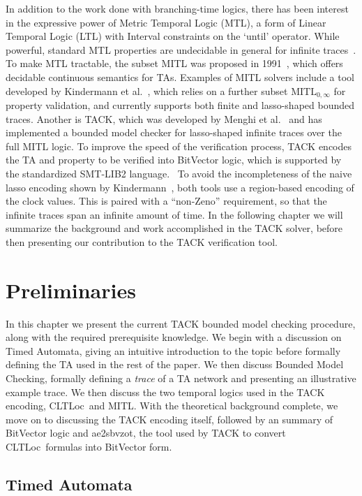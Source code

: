 \documentclass[a4paper,11pt]{report}
\theoremstyle{definition}
\newcommand{\cltloc}{CLTLoc}
\newcommand{\aez}{ae2sbvzot}
\begin{document}
In addition to the work done with branching-time logics, there has been interest
in the expressive power of Metric Temporal Logic (MTL), a form of Linear
Temporal Logic (LTL) with Interval constraints on the `until' operator. While
powerful, standard MTL properties are undecidable in general for infinite
traces~\cite{bouyer09}. To make MTL tractable, the subset MITL was proposed in
1991~\cite{Alur91thebenefits}, which offers decidable continuous semantics for
TAs. Examples of MITL solvers include a tool developed by Kindermann et
al.~\cite{kindermann13}, which relies on a further subset
$\text{MITL}_{0,\infty}$ for property validation, and currently supports both
finite and lasso-shaped bounded traces. Another is TACK, which was developed by
Menghi et al.~\cite{tack20} and has implemented a bounded model checker for
lasso-shaped infinite traces over the full MITL logic. To improve the speed of
the verification process, TACK encodes the TA and property to be verified into
BitVector logic, which is supported by the standardized SMT-LIB2
language.~\cite{baresi15,baresi16} To avoid the incompleteness of the naive
lasso encoding shown by Kindermann~\cite{kindermann12}, both tools use a
region-based encoding of the clock values. This is paired with a ``non-Zeno''
requirement, so that the infinite traces span an infinite amount of time. In the
following chapter we will summarize the background and work accomplished in the
TACK solver, before then presenting our contribution to the TACK verification
tool.

\chapter{Preliminaries}\label{prelims}

In this chapter we present the current TACK bounded model checking procedure,
along with the required prerequisite knowledge. We begin with a discussion on
Timed Automata, giving an intuitive introduction to the topic before
formally defining the TA used in the rest of the paper. We then discuss Bounded
Model Checking, formally defining a \emph{trace} of a TA network and presenting
an illustrative example trace. We then discuss the two temporal logics used in
the TACK encoding, \cltloc\ and MITL. With the theoretical background complete,
we move on to discussing the TACK encoding itself, followed by an summary of
BitVector logic and \aez, the tool used by TACK to convert \cltloc\ formulas
into BitVector form.

\section{Timed Automata}\label{timed-automata}
\end{document}
